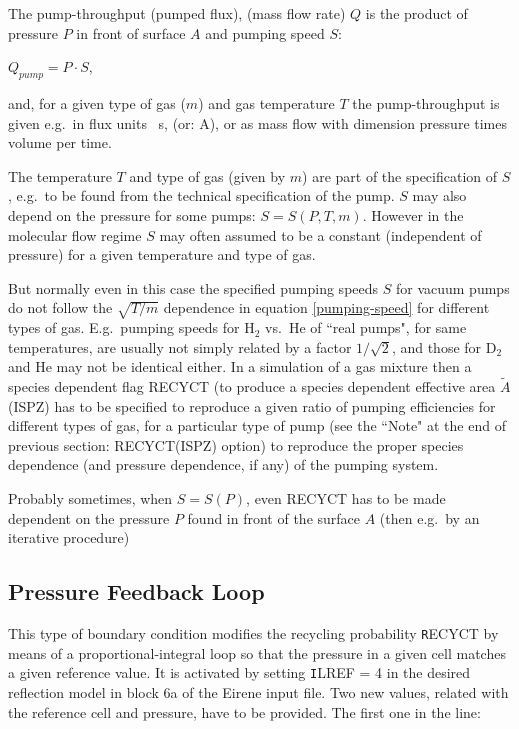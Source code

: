 The pump-throughput (pumped flux), (mass flow rate) $Q$ is the product of
pressure $P$  in front of surface $A$ and pumping speed $S$:

$Q_{pump} = P \cdot S$, 

and, for a given type of gas ($m$) and gas temperature $T$  the pump-throughput
is given e.g.\ in flux units \si{\per\second}, (or: \si{\ampere}), or as mass
flow with dimension pressure times volume per time.

The temperature $T$ and type of gas (given by $m$) are part of the
specification of $S$, e.g.\ to be found from the technical specification of the
pump.
$S$ may also depend on the pressure for some pumps: $S = S(P,T,m)$.
However in the molecular flow regime $S$ may often assumed to be a constant
(independent of pressure) for a given temperature and type of gas.

But normally even in this case	the specified pumping speeds $S$ for vacuum
pumps do not follow the $\sqrt{T/m}$ dependence in equation
\cref{pumping-speed} for different types of gas.
E.g.\ pumping speeds for  H$_2$ vs.\ He of ``real pumps", for same
temperatures, are usually not simply related by a factor $1/\sqrt{2}$, and
those for D$_2$ and He may not be identical either.
In a simulation of a gas mixture then a species dependent flag RECYCT (to
produce a species dependent effective area $\tilde{A}$(ISPZ) has to be
specified to reproduce a given ratio of pumping efficiencies for different
types of gas, for a particular type of pump (see the ``Note" at the end of
previous section: RECYCT(ISPZ) option) to reproduce the proper species
dependence (and pressure dependence, if any) of the pumping system.

Probably sometimes, when $S=S(P)$, even RECYCT has to be made dependent on the
pressure $P$ found in front of the surface $A$ (then e.g.\ by an iterative
procedure)

\subsection{Pressure Feedback Loop}

This type of boundary condition modifies the recycling probability 
{\texttt RECYCT} by means of a proportional-integral loop so that the pressure 
in a given cell matches a given reference value. It is activated by setting 
{\texttt ILREF = 4} in the desired reflection model in block 6a of the Eirene 
input file. Two new values, related with the reference cell and pressure, 
have to be provided. The first one in the line:

